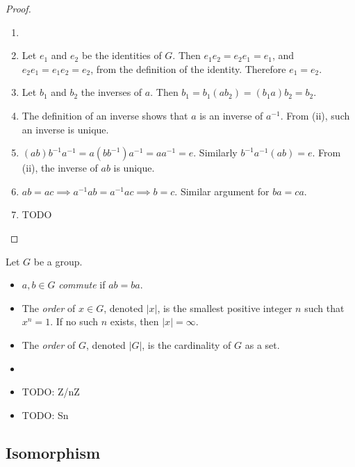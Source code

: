     \begin{proof}
        \begin{enumerate} \item[]
        \item Let $e_1$ and $e_2$ be the identities of $G$. Then $e_1e_2=e_2e_1=e_1$, and $e_2e_1=e_1e_2=e_2$, from the definition of the identity. Therefore $e_1=e_2$.
        \item Let $b_1$ and $b_2$ the inverses of $a$. Then $b_1 = b_1(ab_2) = (b_1a)b_2 = b_2$.
        \item The definition of an inverse shows that $a$ is an inverse of $a^{-1}$. From (ii), such an inverse is unique.
        \item $(ab)b^{-1}a^{-1} = a(bb^{-1})a^{-1} = aa^{-1} = e$. Similarly $b^{-1}a^{-1}(ab) = e$. From (ii), the inverse of $ab$ is unique.
        \item $ab=ac \implies a^{-1}ab=a^{-1}ac \implies b=c$. Similar argument for $ba=ca$.
        \item TODO
        \end{enumerate}
    \end{proof}
    
    \begin{defn} \label{def_group_misc}
        Let $G$ be a group. \begin{itemize}
        \item $a,b \in G$ \emph{commute} if $ab=ba$.
        \item The \emph{order} of $x \in G$, denoted $|x|$, is the smallest positive integer $n$ such that $x^n=1$. If no such $n$ exists, then $|x|=\infty$.
        \item The \emph{order} of $G$, denoted $|G|$, is the cardinality of $G$ as a set.
    \end{itemize} \end{defn}
    
    \begin{defn} \label{def_group_example} \begin{itemize}
        \item[]
        \item TODO: Z/nZ
        \item TODO: Sn
    \end{itemize} \end{defn}
    
    \subsection{Isomorphism}
    
